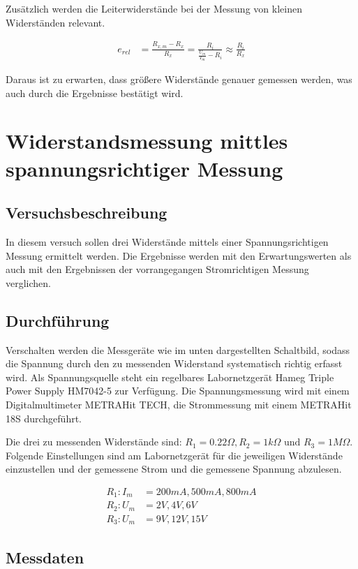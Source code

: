 Zusätzlich werden die Leiterwiderstände bei der Messung von kleinen Widerständen relevant.

\begin{align}
    e_{rel} &= \frac{R_{x,m} - R_x}{R_x} = \frac{R_i}{\frac{U_m}{I_m} - R_i} \approx \frac{R_i}{R_x}
\end{align}

Daraus ist zu erwarten, dass größere Widerstände genauer gemessen werden, was auch durch die Ergebnisse bestätigt wird.

\section[Spannungsrichtige Messung]{Widerstandsmessung mittles spannungsrichtiger Messung}
\subsection{Versuchsbeschreibung}
In diesem versuch sollen drei Widerstände mittels einer Spannungsrichtigen Messung ermittelt werden. Die Ergebnisse werden mit den Erwartungswerten als auch mit den Ergebnissen der vorrangegangen Stromrichtigen Messung verglichen.

\subsection{Durchführung}
Verschalten werden die Messgeräte wie im unten dargestellten Schaltbild, sodass die Spannung durch den zu messenden Widerstand systematisch richtig erfasst wird. Als Spannungsquelle steht ein regelbares Labornetzgerät Hameg Triple Power Supply HM7042-5 zur Verfügung. Die Spannungsmessung wird mit einem Digitalmultimeter METRAHit TECH, die Strommessung mit einem METRAHit 18S durchgeführt.

Die drei zu messenden Widerstände sind: \(R_1 = 0.22\Omega, R_2 = 1k\Omega \text{ und } R_3 = 1M\Omega\).
Folgende Einstellungen sind am Labornetzgerät für die jeweiligen Widerstände einzustellen und der gemessene Strom und die gemessene Spannung abzulesen.

\[
\begin{aligned}
R_1: I_m &= 200mA, 500mA, 800mA\\
R_2: U_m &= 2V, 4V, 6V\\
R_3: U_m &= 9V, 12V, 15V
\end{aligned}
\]

\subsection{Messdaten}

